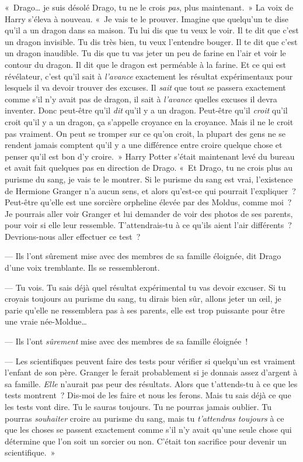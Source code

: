 «~Drago… je suis désolé Drago, tu ne le crois \emph{pas}, plus maintenant.~»
La voix de Harry s'éleva à nouveau.
«~Je vais te le prouver.
Imagine que quelqu'un te dise qu'il a un dragon dans sa maison.
Tu lui dis que tu veux le voir.
Il te dit que c'est un dragon invisible.
Tu dis très bien, tu veux l'entendre bouger.
Il te dit que c'est un dragon inaudible.
Tu dis que tu vas jeter un peu de farine en l'air et voir le contour du dragon.
Il dit que le dragon est perméable à la farine.
Et ce qui est révélateur, c'est qu'il sait à \emph{l'avance} exactement les résultat expérimentaux pour lesquels il va devoir trouver des excuses.
Il \emph{sait} que tout se passera exactement comme s'il n'y avait pas de dragon, il sait à \emph{l'avance} quelles excuses il devra inventer.
Donc peut-être qu'il \emph{dit} qu'il y a un dragon.
Peut-être qu'il \emph{croit} qu'il croit qu'il y a un dragon, ça s'appelle croyance en la croyance.
Mais il ne le croit pas vraiment.
On peut se tromper sur ce qu'on croit, la plupart des gens ne se rendent jamais comptent qu'il y a une différence entre croire quelque chose et penser qu'il est bon d'y croire.~»
Harry Potter s'était maintenant levé du bureau et avait fait quelques pas en direction de Drago.
«~Et Drago, tu ne crois plus au purisme du sang, je vais te le montrer.
Si le purisme du sang est vrai, l'existence de Hermione Granger n'a aucun sens, et alors qu'est-ce qui pourrait l'expliquer~?
Peut-être qu'elle est une sorcière orpheline élevée par des Moldus, comme moi~?
Je pourrais aller voir Granger et lui demander de voir des photos de ses parents, pour voir si elle leur ressemble.
T'attendrais-tu à ce qu'ils aient l'air différents~?
Devrions-nous aller effectuer ce test~?

--- Ils l'ont sûrement mise avec des membres de sa famille éloignée, dit Drago d’une voix tremblante.
Ils se ressembleront.

--- Tu vois.
Tu sais déjà quel résultat expérimental tu vas devoir excuser.
Si tu croyais toujours au purisme du sang, tu dirais bien sûr, allons jeter un œil, je parie qu'elle ne ressemblera pas à ses parents, elle est trop puissante pour être une vraie née-Moldue…

--- Ils l'ont \emph{sûrement} mise avec des membres de sa famille éloignée~!

--- Les scientifiques peuvent faire des tests pour vérifier si quelqu'un est vraiment l'enfant de son père.
Granger le ferait probablement si je donnais assez d'argent à sa famille.
\emph{Elle} n'aurait pas peur des résultats.
Alors que t'attends-tu à ce que les tests montrent~?
Dis-moi de les faire et nous les ferons.
Mais tu sais déjà ce que les tests vont dire.
Tu le sauras toujours.
Tu ne pourras jamais oublier.
Tu pourras \emph{souhaiter} croire au purisme du sang, mais tu \emph{t'attendras toujours} à ce que les choses se passent exactement comme s'il n'y avait qu'une seule chose qui détermine que l'on soit un sorcier ou non.
C'était ton sacrifice pour devenir un scientifique.~»

